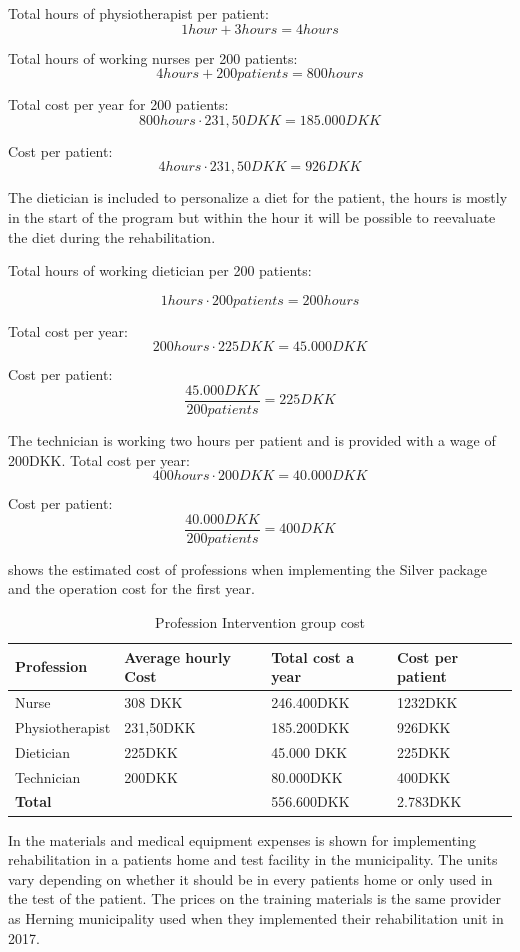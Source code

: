 Total hours of physiotherapist per patient:
$$1hour + 3hours=4hours$$

Total hours of working nurses per 200 patients:
$$4hours + 200patients=800hours$$

Total cost per year for 200 patients:
$$800hours\cdot231,50DKK= 185.000DKK$$

Cost per patient:
$$4hours \cdot 231,50DKK=926DKK$$

The dietician is included to personalize a diet for the patient, the hours is mostly in the start of the program but within the hour it will be possible to reevaluate the diet during the rehabilitation.  

Total hours of working dietician per 200 patients:

$$1hours\cdot200patients=200hours$$

Total cost per year:
$$200hours\cdot225DKK=45.000DKK$$

Cost per patient:
$$\frac{45.000DKK}{200patients}=225DKK$$

The technician is working two hours per patient and is provided with a wage of 200DKK. 
Total cost per year:
$$400hours\cdot200DKK=40.000DKK$$

Cost per patient:
$$\frac{40.000DKK}{200patients}=400DKK$$

 shows the estimated cost of professions when implementing the Silver package and the operation cost for the first year.

\begin{table}[H]
\begin{longtabu} to 
    \textbf{Profession} & \textbf{Average hourly Cost} & \textbf{Total cost a year} & \textbf{Cost per patient} \\[-1ex]
    \midrule
     Nurse   &    308 DKK & 246.400DKK & 1232DKK \\ \hline
    Physiotherapist   &   231,50DKK  & 185.200DKK & 926DKK \\ \hline
    Dietician   &  225DKK &    45.000 DKK    & 225DKK \\ \hline
    Technician & 200DKK & 80.000DKK & 400DKK \\
    \hline \hline \hline
    \textbf{Total} & & 556.600DKK & 2.783DKK
    \newline
   \end{longtabu}
\caption{Profession Intervention group cost}
\label{tab: PI}
\end{table}

In  the materials and medical equipment expenses is shown for implementing rehabilitation in a patients home and test facility in the municipality. The units vary depending on whether it should be in every patients home or only used in the test of the patient. The prices on the training materials is the same provider as Herning municipality used when they implemented their rehabilitation unit in 2017.


